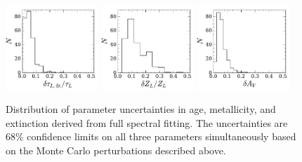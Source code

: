 


\begin{figure}
  \centering
  \includegraphics[width=0.31\textwidth]{891_2/figs/fit_uncertainty_MLWA.pdf}
  \includegraphics[width=0.31\textwidth]{891_2/figs/fit_uncertainty_MLWZ.pdf}
  \includegraphics[width=0.31\textwidth]{891_2/figs/fit_uncertainty_TAUV.pdf}
  \caption[Distributions of fit uncertainties in $\tau_L$, $Z_L$,
    $A_V$]{\fixspacing\label{891_2:fig:fit_err_hist}Distribution of
    parameter uncertainties in age, metallicity, and extinction
    derived from full spectral fitting.  The uncertainties are 68\%
    confidence limits on all three parameters simultaneously based on
    the Monte Carlo perturbations described above.}
\end{figure}


